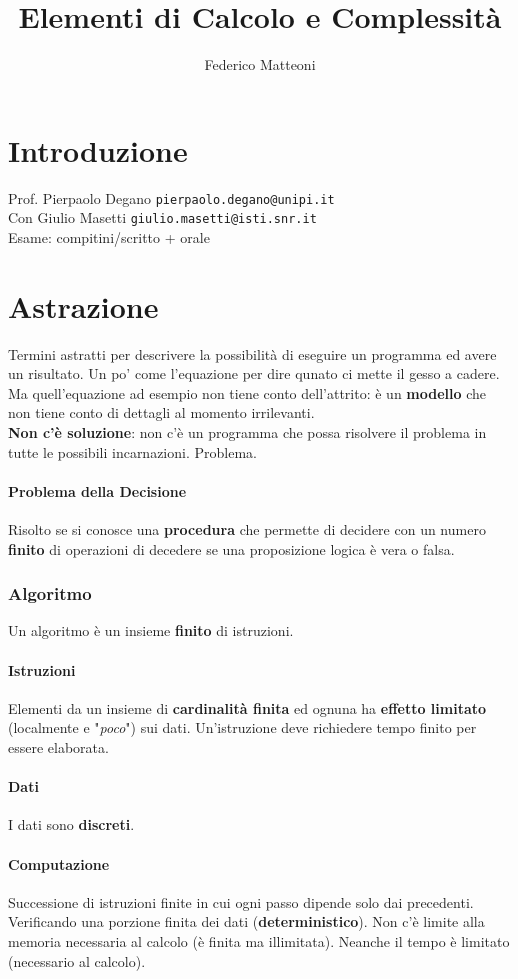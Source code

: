 \documentclass[10pt]{article}
\begin{document}
\title{Elementi di Calcolo e Complessità}
\author{Federico Matteoni}
\date{ }
\renewcommand*\contentsname{Indice}
\maketitle

\section{Introduzione}
Prof. Pierpaolo Degano \texttt{pierpaolo.degano@unipi.it}\\
Con Giulio Masetti \texttt{giulio.masetti@isti.snr.it}\\
Esame: compitini/scritto + orale

\section{Astrazione}
Termini astratti per descrivere la possibilità di eseguire un programma ed avere un risultato. Un po' come l'equazione per dire qunato ci mette il gesso a cadere.\\
Ma quell'equazione ad esempio non tiene conto dell'attrito: è un \textbf{modello} che non tiene conto di dettagli al momento irrilevanti.\\
\textbf{Non c'è soluzione}: non c'è un programma che possa risolvere il problema in tutte le possibili incarnazioni. Problema.
\paragraph{Problema della Decisione} Risolto se si conosce una \textbf{procedura} che permette di decidere con un numero \textbf{finito} di operazioni di decedere se una proposizione logica è vera o falsa.

\subsubsection{Algoritmo}
Un algoritmo è un insieme \textbf{finito} di istruzioni.
\paragraph{Istruzioni} Elementi da un insieme di \textbf{cardinalità finita} ed ognuna ha \textbf{effetto limitato} (localmente e "\textit{poco}") sui dati. Un'istruzione deve richiedere tempo finito per essere elaborata.
\paragraph{Dati} I dati sono \textbf{discreti}.
\paragraph{Computazione} Successione di istruzioni finite in cui ogni passo dipende solo dai precedenti. Verificando una porzione finita dei dati (\textbf{deterministico}). Non c'è limite alla memoria necessaria al calcolo (è finita ma illimitata). Neanche il tempo è limitato (necessario al calcolo).
\end{document}
